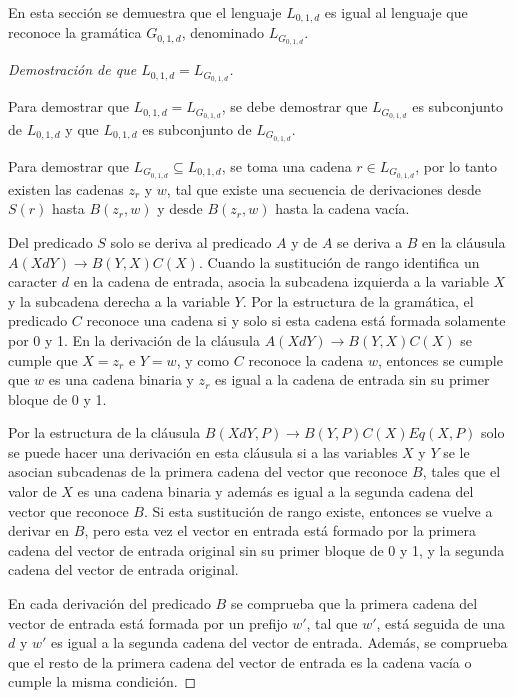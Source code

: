 En esta sección se demuestra que el lenguaje $L_{0,1,d}$ es igual al lenguaje que reconoce la gramática $G_{0,1,d}$,
denominado $L_{G_{0,1,d}}$.

\begin{proof}[Demostración de que $L_{0,1,d}=L_{G_{0,1,d}}$] \
    
    Para demostrar que $L_{0,1,d}=L_{G_{0,1,d}}$, se debe demostrar que $L_{G_{0,1,d}}$ es subconjunto de $L_{0,1,d}$ y que
    $L_{0,1,d}$ es subconjunto de $L_{G_{0,1,d}}$. 
    
    Para demostrar que $L_{G_{0,1,d}}\subseteq L_{0,1,d}$, se toma una cadena $r\in L_{G_{0,1,d}}$, por lo tanto existen las cadenas $z_r$ y $w$, tal que existe una secuencia de derivaciones desde $S(r)$ hasta $B(z_r,w)$ y desde $B(z_r,w)$ hasta la cadena vacía.
    
    Del predicado $S$ solo se deriva al predicado $A$ y de $A$ se deriva a $B$ en la cláusula $A(XdY)\to B(Y,X)C(X)$.  Cuando la sustitución de rango identifica un caracter $d$ en la cadena de entrada, asocia la subcadena izquierda a la variable $X$ y la subcadena derecha a la variable $Y$. Por la estructura de la gramática, el predicado $C$ reconoce una cadena si y solo si esta cadena está formada solamente por 0 y 1. En la derivación de la cláusula $A(XdY)\to B(Y,X)C(X)$ se cumple que $X=z_r$ e $Y=w$, y como $C$ reconoce la cadena $w$, entonces se cumple que $w$ es una cadena binaria y $z_r$ es igual a la cadena de entrada sin su primer bloque de 0 y 1.
    
    Por la estructura de la cláusula $B(XdY,P)\to B(Y,P) C(X) Eq(X,P)$ solo se puede hacer una derivación en esta cláusula si a las variables $X$ y $Y$ se le asocian subcadenas de la primera cadena del vector que reconoce $B$, tales que el valor de $X$ es una cadena binaria y además es igual a la segunda cadena del vector que reconoce $B$. Si esta sustitución de rango existe, entonces se vuelve a derivar en $B$, pero esta vez el vector en entrada está formado por la primera cadena del vector de entrada original sin su primer bloque de 0 y 1, y la segunda cadena del vector de entrada original.
    
    En cada derivación del predicado $B$ se comprueba que la primera cadena del vector de entrada está formada por un prefijo $w'$, tal que $w'$, está seguida de una $d$ y $w'$ es igual a la segunda cadena del vector de entrada. Además, se comprueba que el resto de la primera cadena del vector de entrada es la cadena vacía o cumple la misma condición.
    

\end{proof}
